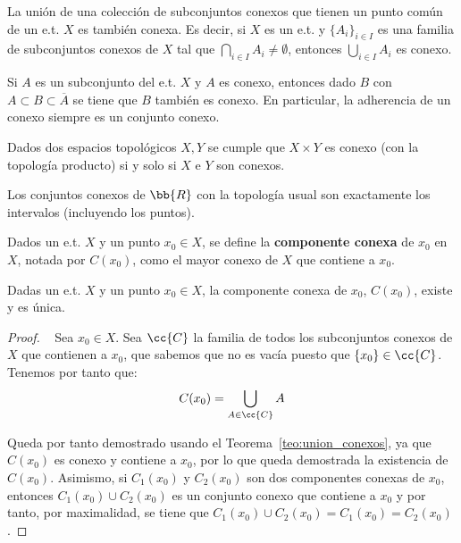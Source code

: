 \begin{teo}\label{teo:union_conexos}
    La unión de una colección de subconjuntos conexos que tienen un punto común de un e.t. $X$ es también conexa. Es decir, si $X$ es un e.t. y $\{A_i\}_{i\in I}$ es una familia de subconjuntos conexos de $X$ tal que $\bigcap\limits_{i\in I}A_i \neq \emptyset$, entonces $\bigcup\limits_{i\in I}A_i$ es conexo.
\end{teo}

\begin{teo}\label{teo:conexo_adherencia}
    Si $A$ es un subconjunto del e.t. $X$ y $A$ es conexo, entonces dado $B$ con $A\subset B\subset\overline{A}$ se tiene que $B$ también es conexo. En particular, la adherencia de un conexo siempre es un conjunto conexo.
\end{teo}

\begin{teo}
    Dados dos espacios topológicos $X,Y$ se cumple que $X\times Y$ es conexo (con la topología producto) si y solo si $X$ e $Y$ son conexos.
\end{teo}

\begin{teo}
    Los conjuntos conexos de $\bb{R}$ con la topología usual son exactamente los intervalos (incluyendo los puntos).
\end{teo}

\begin{definicion}
    Dados un e.t. $X$ y un punto $x_0\in X$, se define la \textbf{componente conexa} de $x_0$ en $X$, notada por $C(x_0)$, como el mayor conexo de $X$ que contiene a $x_0$.
\end{definicion}
\begin{prop}
    Dadas un e.t. $X$ y un punto $x_0\in X$, la componente conexa de $x_0$, $C(x_0)$, existe y es única.
    \begin{proof}~
        Sea $x_0 \in X$. Sea $\cc{C}$ la familia de todos los subconjuntos conexos de $X$ que contienen a $x_0$, que sabemos que no es vacía puesto que $\{x_0\}\in \cc{C}$. Tenemos por tanto que:
        \begin{gather*}
            C(x_0) = \bigcup\limits_{A\in \cc{C}} A
        \end{gather*}

        Queda por tanto demostrado usando el Teorema~\ref{teo:union_conexos}, ya que $C(x_0)$ es conexo y contiene a $x_0$, por lo que queda
        demostrada la existencia de $C(x_0)$. Asimismo, si $C_1(x_0)$ y $C_2(x_0)$ son dos componentes conexas de $x_0$, entonces $C_1(x_0)\cup C_2(x_0)$ es un conjunto conexo que contiene a $x_0$ y por tanto, por maximalidad, se tiene que $C_1(x_0)\cup C_2(x_0) = C_1(x_0) = C_2(x_0)$.
    \end{proof}
\end{prop}


